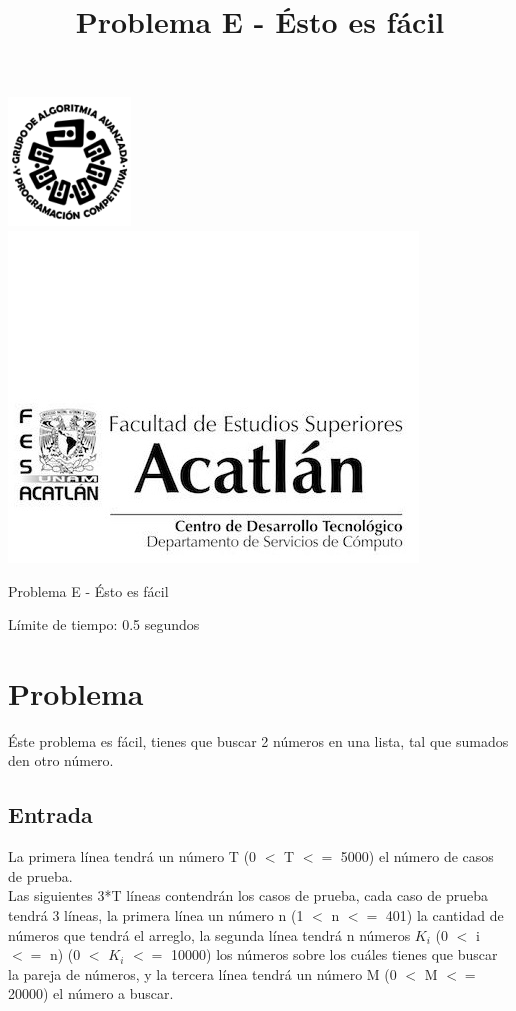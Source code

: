 \documentclass[letter,10pt]{article}
\date{}
\begin{document}
\title{Problema E - Ésto es fácil}

\includegraphics[scale=0.6]{logo} \hspace*{9.00cm}
\includegraphics[scale=0.5]{dsc} 
\bigskip
\begin{center}
    \Large Problema E - Ésto es fácil
\end{center}

\begin{flushright}
Límite de tiempo: 0.5 segundos
\par\end{flushright}
\bigskip

\section*{Problema}

Éste problema es fácil, tienes que buscar 2 números en una lista, tal que sumados den otro número.

\subsection*{Entrada}

La primera línea tendrá un número T (0 $<$ T $<=$ 5000) el número de casos de prueba.\\[0.1cm]
Las siguientes 3*T líneas contendrán los casos de prueba, cada caso de prueba tendrá 3 líneas, la primera línea un número n (1 $<$ n $<=$ 401) la cantidad de números que tendrá el arreglo, la segunda línea tendrá n números $K_i$ (0 $<$ i $<=$ n) (0 $<$ $K_i$ $<=$ 10000) los números sobre los cuáles tienes que buscar la pareja de números, y la tercera línea tendrá un número M (0 $<$ M $<=$ 20000) el número a buscar.
\end{document}
